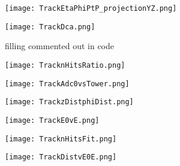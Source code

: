 \documentclass{beamer}
\begin{document}
\begin{frame}
  \begin{figure}[h!]
  \centering
  \texttt{[image: TrackEtaPhiPtP\_projectionYZ.png]}
  \end{figure}
\end{frame}

\begin{frame}
  \begin{figure}[h!]
  \centering
  \texttt{[image: TrackDca.png]}
  \caption{filling commented out in code}
  \end{figure}
\end{frame}

\begin{frame}
  \begin{figure}[h!]
  \centering
  \texttt{[image: TracknHitsRatio.png]}
  \end{figure}
\end{frame}

\begin{frame}
  \begin{figure}[h!]
  \centering
  \texttt{[image: TrackAdc0vsTower.png]}
  \end{figure}
\end{frame}

\begin{frame}
  \begin{figure}[h!]
  \centering
  \texttt{[image: TrackzDistphiDist.png]}
  \end{figure}
\end{frame}

\begin{frame}
  \begin{figure}[h!]
  \centering
  \texttt{[image: TrackE0vE.png]}
  \end{figure}
\end{frame}

\begin{frame}
  \begin{figure}[h!]
  \centering
  \texttt{[image: TracknHitsFit.png]}
  \end{figure}
\end{frame}

\begin{frame}
  \begin{figure}[h!]
  \centering
  \texttt{[image: TrackDistvE0E.png]}
  \end{figure}
\end{frame}
\end{document}
